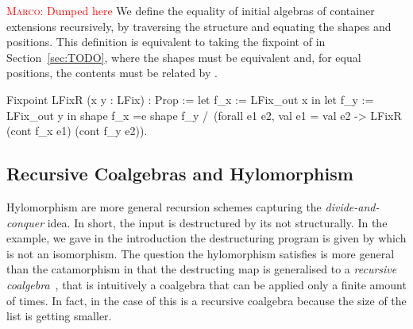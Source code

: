 \documentclass[anonymous, a4paper, UKenglish, cleveref, autoref, thm-restate]{lipics-v2021}
\newcommand{\mpav}[1]{\textcolor{red}{\textsc{Marco}: #1}}
\begin{document}
\mpav{Dumped here}
We define the equality of initial algebras of container extensions recursively,
by traversing the structure and equating the shapes and positions. This
definition is equivalent to taking the fixpoint of  in
Section~\ref{sec:TODO}, where the shapes must be equivalent and, for equal
positions, the contents must be related by .
\begin{coqcode}
Fixpoint LFixR (x y : LFix) : Prop :=
  let f_x := LFix_out x in
  let f_y := LFix_out y in
  shape f_x =e shape f_y /\
    (forall e1 e2, val e1 = val e2 -> LFixR (cont f_x e1) (cont f_y e2)).
\end{coqcode}


\subsection{Recursive Coalgebras and Hylomorphism}
\label{sec:rec-coalgebras}

Hylomorphism are more general recursion schemes capturing the
\emph{divide-and-conquer} idea. In short, the input is destructured by its not
structurally. In the example, we gave in the introduction the destructuring
program is given by \coq{divide} which is not an isomorphism.  The question the
hylomorphism satisfies is more general than the catamorphism in that the
destructing map \coq{InOp} is generalised to a \emph{recursive
coalgebra}~\cite{AdamekMM19,CaprettaUV04}, that is intuitively a coalgebra that
can be applied only a finite amount of times.  In fact, in the case
of \coq{divide} this is a recursive coalgebra because the size of the list is
getting smaller.

\end{document}
